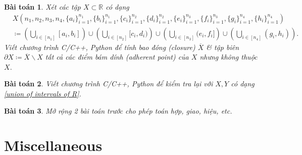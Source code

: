 \documentclass{article}
\newtheorem{baitoan}{Bài toán}
\begin{document}
\begin{baitoan}
	Xét các tập $X\subset\mathbb{R}$ có dạng
	\begin{align}
		\label{union of intervals of R}
		&X\left(n_1,n_2,n_3,n_4,\{a_i\}_{i=1}^{n_1},\{b_i\}_{i=1}^{n_1},\{c_i\}_{i=1}^{n_2},\{d_i\}_{i=1}^{n_2},\{e_i\}_{i=1}^{n_3},\{f_i\}_{i=1}^{n_3},\{g_i\}_{i=1}^{n_4},\{h_i\}_{i=1}^{n_4}\right)\nonumber\\
		&\coloneqq\left(\bigcup_{i\in[n_1]} [a_i,b_i]\right)\cup\left(\bigcup_{i\in[n_2]} [c_i,d_i)\right)\cup\left(\bigcup_{i\in[n_3]} (e_i,f_i]\right)\cup\left(\bigcup_{i\in[n_4]} (g_i,h_i)\right).
	\end{align}
	Viết chương trình {\sf C/C++, Python} để tính bao đóng (closure) $\overline{X}$ \& tập biên $\partial X\coloneqq\overline{X}\backslash X$ tất cả các điểm bám dính (adherent point) của $X$ nhưng không thuộc $X$.
\end{baitoan}

\begin{baitoan}
	Viết chương trình {\sf C/C++, Python} để kiểm tra lại \cite[Lem. 9.1.11]{Tao_analysis_1} với $X,Y$ có dạng \eqref{union of intervals of R}.
\end{baitoan}

\begin{baitoan}
	Mở rộng 2 bài toán trước cho phép toán hợp, giao, hiệu, etc.
\end{baitoan}


\section{Miscellaneous}


\printbibliography[heading=bibintoc]
	
\end{document}
